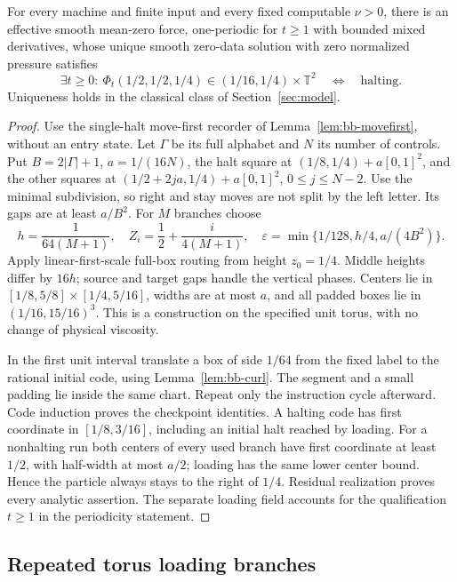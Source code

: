 \begin{theorem}
\label{ba:loaded-torus}
For every machine and finite input and every fixed computable $\nu>0$,
there is an effective smooth
mean-zero force, one-periodic for $t\ge1$ with bounded mixed derivatives,
whose unique smooth zero-data solution with zero normalized pressure
satisfies
\[
 \exists t\ge0:\ \Phi_t(1/2,1/2,1/4)
       \in(1/16,1/4)\times\mathbb T^2
 \quad\Longleftrightarrow\quad\text{halting}.
\]
Uniqueness holds in the classical class of Section~\ref{sec:model}.
\end{theorem}
\begin{proof}\label{ba:loaded-torus-proof}
Use the single-halt move-first recorder of
Lemma~\ref{lem:bb-movefirst}, without an entry state.  Let
$\Gamma$ be its full alphabet and $N$ its number of controls.  Put
$B=2|\Gamma|+1$, $a=1/(16N)$, the halt square at
$(1/8,1/4)+a[0,1]^2$, and the other squares at
$(1/2+2ja,1/4)+a[0,1]^2$, $0\le j\le N-2$.
Use the minimal subdivision, so right and stay moves are not split by
the left letter.  Its gaps are at least $a/B^2$.
For $M$ branches choose
\[
 h=\frac1{64(M+1)},\quad Z_i=\frac12+\frac{i}{4(M+1)},\quad
 \varepsilon=\min\{1/128,h/4,a/(4B^2)\}.
\]
Apply linear-first-scale full-box routing from height $z_0=1/4$.
Middle heights differ by $16h$; source and target gaps handle the
vertical phases.  Centers lie in
$[1/8,5/8]\times[1/4,5/16]$, widths are at most $a$, and all padded
boxes lie in $(1/16,15/16)^3$.  This is a construction on the specified
unit torus, with no change of physical viscosity.

In the first unit interval translate a box of side $1/64$ from the
fixed label to the rational initial code, using Lemma~\ref{lem:bb-curl}.
The segment and a small padding lie inside the same chart.  Repeat
only the instruction cycle afterward.  Code induction proves the
checkpoint identities.  A halting code has first coordinate in
$[1/8,3/16]$, including an initial halt reached by loading.  For a
nonhalting run both centers of every used branch have first coordinate
at least $1/2$, with half-width at most $a/2$; loading has the same
lower center bound.  Hence the particle always stays to the right of
$1/4$.  Residual realization proves every analytic assertion.  The
separate loading field accounts for the qualification $t\ge1$ in the
periodicity statement.
\end{proof}


\subsection{Repeated torus loading branches}\label{ba:torus}

